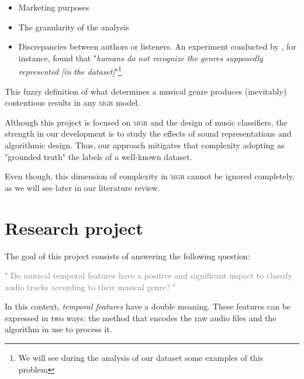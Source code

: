 \begin{itemize}
  \item Marketing purposes
  \item The granularity of the analysis %
  \newline
{}
  \item Discrepancies between authors or listeners. An experiment conducted by \citet{44}, for instance, found that "{\it humans do not recognize the genres supposedly represented [in the dataset]}"\footnote{We will see during the analysis of our dataset some examples of this problem}
\end{itemize}

This fuzzy definition of what determines a musical genre produces (inevitably) contentious results in any \textsc{\textsc{mgr}} model.

Although this project is focused on \textsc{\textsc{mgr}} and the design of music classifiers, the strength in our development is to study the effects of sound representations and algorithmic design. Thus, our approach mitigates that complexity adopting as "grounded truth" the labels of a well-known dataset.

Even though, this dimension of complexity in \textsc{\textsc{mgr}} cannot be ignored completely, as we will see later in our literature review.

\section{Research project}

The goal of this project consists of answering the following question:

\begin{center}
\textcolor{gray}{
  \large{
  " Do musical temporal features have a positive and significant impact to classify audio tracks according to their musical genre? "
  }
}
\end{center}

\normalsize

In this context, {\it temporal features} have a double meaning. These features can be expressed in two ways: the method that encodes the raw audio files and the algorithm in use to process it.

